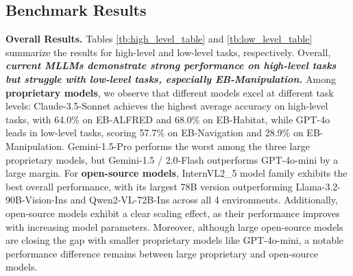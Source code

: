 \vspace{-5pt}

\subsection{Benchmark Results}\label{sec:benchmark_res}

\textbf{Overall Results.} Tables \ref{tb:high_level_table} and \ref{tb:low_level_table} summarize the results for high-level and low-level tasks, respectively. Overall, \textit{\textbf{current MLLMs demonstrate strong performance on high-level tasks but struggle with low-level tasks, especially EB-Manipulation.}}
Among \textbf{proprietary models}, we observe that different models excel at different task levels: Claude-3.5-Sonnet achieves the highest average accuracy on high-level tasks, with 64.0\% on EB-ALFRED and 68.0\% on EB-Habitat, while GPT-4o leads in low-level tasks, scoring 57.7\% on EB-Navigation and 28.9\% on EB-Manipulation. Gemini-1.5-Pro performs the worst among the three large proprietary models, but Gemini-1.5 / 2.0-Flash outperforms GPT-4o-mini by a large margin. For \textbf{open-source models}, InternVL2\_5 model family exhibits the best overall performance, with its largest 78B version outperforming Llama-3.2-90B-Vision-Ins and Qwen2-VL-72B-Ins across all 4 environments. Additionally, open-source models exhibit a clear scaling effect, as their performance improves with increasing model parameters. Moreover, although large open-source models are closing the gap with smaller proprietary models like GPT-4o-mini, a notable performance difference remains between large proprietary and open-source models. 


